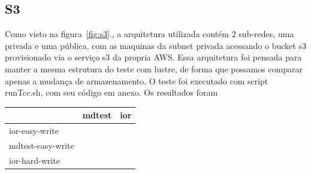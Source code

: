 \documentclass[article,a4paper,12pt,brazil,sumario=tradicional]{abntex2}
\begin{document}
\subsection{S3}
Como visto na figura~\ref{fig:s3}., a arquitetura utilizada contém 2 sub-redes, uma privada e uma pública, com as maquinas da subnet privada acessando o bucket s3 provisionado via o serviço s3 da propria AWS. Essa arquitetura foi pensada para manter a mesma estrutura do teste com lustre, de forma que possamos comparar apenas a mudança de armazenamento. O teste foi executado com script runTcc.sh, com seu código em anexo. Os resultados foram

\begin{table}[htb]
	\begin{tabular}{|l|l|l|}
		\hline
		& mdtest & ior \\ \hline
		ior-easy-write    &        &     \\ \hline
		mdtest-easy-write &        &     \\ \hline
		ior-hard-write    &        &     \\ \hline
	\end{tabular}
\end{table}
\end{document}
